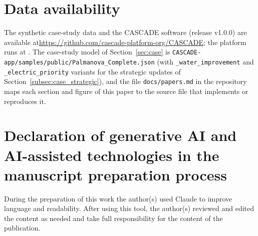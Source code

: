 \documentclass[review,12pt]{elsarticle}
\def\url#1{}%
\def\newline{\unskip}%
\begin{document}
\section*{Data availability}
The synthetic case-study data and the CASCADE software (release v1.0.0) are available at\newline \href{https://github.com/cascade-platform-org/CASCADE}{https://github.com/cascade-platform-org/CASCADE}; the platform runs at \url{https://app.cascade-platform.org/}. The case-study model of Section~\ref{sec:case} is \texttt{CASCADE-app/samples/public/Palmanova\_Complete.json} (with \texttt{\_water\_improvement} and \texttt{\_electric\_priority} variants for the strategic updates of Section~\ref{subsec:case_strategic}), and the file \texttt{docs/papers.md} in the repository maps each section and figure of this paper to the source file that implements or reproduces it.

\section*{Declaration of generative AI and AI-assisted technologies in the manuscript preparation process}
During the preparation of this work the author(s) used Claude to improve language and readability. After using this tool, the author(s) reviewed and edited the content as needed and take full responsibility for the content of the publication.

\newpage


\end{document}
